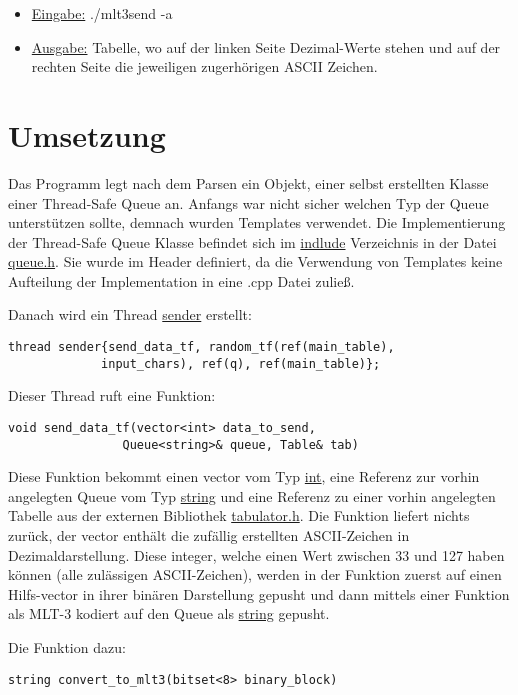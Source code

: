 \documentclass{article}
\begin{document}
\begin{itemize}
	\item \underline{Eingabe:} ./mlt3send -a
	\item \underline{Ausgabe:} Tabelle, wo auf der linken Seite Dezimal-Werte stehen und auf der rechten Seite die jeweiligen zugerhörigen ASCII Zeichen.\\
\end{itemize}

\section{Umsetzung}
Das Programm legt nach dem Parsen ein Objekt, einer selbst erstellten Klasse einer Thread-Safe Queue an. Anfangs war nicht sicher welchen Typ der Queue unterstützen sollte,
demnach wurden Templates verwendet. Die Implementierung der Thread-Safe Queue Klasse befindet sich im \underline{indlude} Verzeichnis in der Datei \underline{queue.h}. Sie
wurde im Header definiert, da die Verwendung von Templates keine Aufteilung der Implementation in eine .cpp Datei zuließ.

Danach wird ein Thread \underline{sender} erstellt:
\begin{lstlisting}
thread sender{send_data_tf, random_tf(ref(main_table),
		     input_chars), ref(q), ref(main_table)};
\end{lstlisting}

Dieser Thread ruft eine Funktion:
\begin{lstlisting}
void send_data_tf(vector<int> data_to_send,
				Queue<string>& queue, Table& tab)
\end{lstlisting}

Diese Funktion bekommt einen vector vom Typ \underline{int}, eine Referenz zur vorhin angelegten Queue vom Typ \underline{string} und eine Referenz zu einer vorhin
angelegten Tabelle aus der externen Bibliothek \underline{tabulator.h}. Die Funktion liefert nichts zurück, der vector enthält die zufällig erstellten ASCII-Zeichen in Dezimaldarstellung.
Diese integer, welche einen Wert zwischen 33 und 127 haben können (alle zulässigen ASCII-Zeichen), werden in der Funktion zuerst auf einen Hilfs-vector in ihrer binären Darstellung
gepusht und dann mittels einer Funktion als MLT-3 kodiert auf den Queue als \underline{string} gepusht. 

Die Funktion dazu:
\begin{lstlisting}
string convert_to_mlt3(bitset<8> binary_block)
\end{lstlisting}
\end{document}
